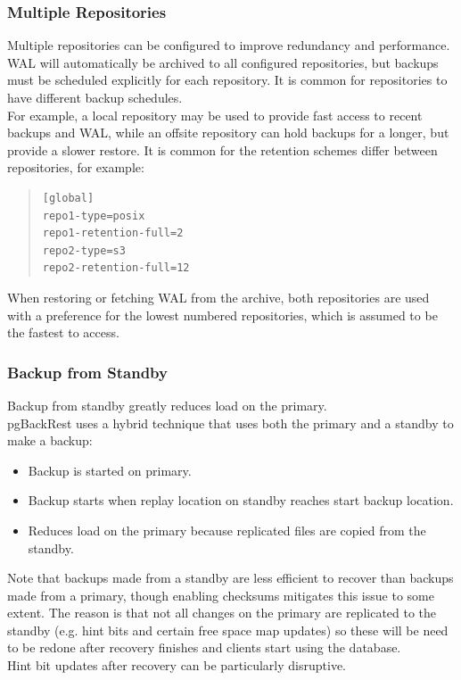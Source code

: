 \begin{frame}[fragile]
    \frametitle{Multiple Repositories}

    Multiple repositories can be configured to improve redundancy and performance. WAL will automatically be archived to all configured repositories, but backups must be scheduled explicitly for each repository. It is common for repositories to have different backup schedules.
    \\\vspace{1em}
    For example, a local repository may be used to provide fast access to recent backups and WAL, while an offsite repository can hold backups for a longer, but provide a slower restore. It is common for the retention schemes differ between repositories, for example:

    \begin{quote}\begin{verbatim}
[global]
repo1-type=posix
repo1-retention-full=2
repo2-type=s3
repo2-retention-full=12
    \end{verbatim}\end{quote}\vspace{-1em}

    When restoring or fetching WAL from the archive, both repositories are used with a preference for the lowest numbered repositories, which is assumed to be the fastest to access.
\end{frame}

\begin{frame}[fragile]
    \frametitle{Backup from Standby}

    Backup from standby greatly reduces load on the primary.
    \\\vspace{1em}
    pgBackRest uses a hybrid technique that uses both the primary and a standby to make a backup:

    \begin{itemize}
        \item Backup is started on primary.
        \item Backup starts when replay location on standby reaches start backup location.
        \item Reduces load on the primary because replicated files are copied from the standby.
    \end{itemize}

    Note that backups made from a standby are less efficient to recover than backups made from a primary, though enabling checksums mitigates this issue to some extent. The reason is that not all changes on the primary are replicated to the standby (e.g. hint bits and certain free space map updates) so these will be need to be redone after recovery finishes and clients start using the database.
    \\\vspace{1em}
    Hint bit updates after recovery can be particularly disruptive.
\end{frame}

